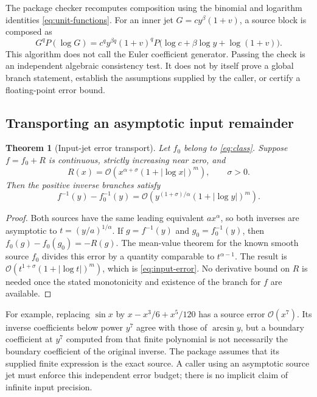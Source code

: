 \documentclass[11pt,a4paper]{article}
\numberwithin{equation}{section}
\newtheorem{theorem}{Theorem}[section]
\theoremstyle{definition}\newtheorem{definition}[theorem]{Definition}
\theoremstyle{remark}\newtheorem{remark}[theorem]{Remark}
\newcommand{\bigO}{\mathcal O}
\begin{document}
The package checker recomputes composition using the binomial and logarithm
identities \eqref{eq:unit-functions}. For an inner jet
\(G=c y^\beta(1+v)\), a source block is composed as
\begin{equation}\label{eq:checker-compose}
 G^q P(\log G)
 =c^q y^{\beta q}(1+v)^q
   P\bigl(\log c+\beta\log y+\log(1+v)\bigr).
\end{equation}
This algorithm does not call the Euler coefficient generator. Passing the
check is an independent algebraic consistency test. It does not by itself
prove a global branch statement, establish the assumptions supplied by the
caller, or certify a floating-point error bound.

\subsection{Transporting an asymptotic input remainder}
\begin{theorem}[Input-jet error transport]\label{thm:input-error}
Let \(f_0\) belong to \eqref{eq:class}. Suppose \(f=f_0+R\) is continuous,
strictly increasing near zero, and
\[
 R(x)=\bigO\!\left(x^{\alpha+\sigma}(1+|\log x|)^m\right),
 \qquad \sigma>0.
\]
Then the positive inverse branches satisfy
\begin{equation}\label{eq:input-error}
 f^{-1}(y)-f_0^{-1}(y)
 =\bigO\!\left(y^{(1+\sigma)/\alpha}(1+|\log y|)^m\right).
\end{equation}
\end{theorem}
\begin{proof}
Both sources have the same leading equivalent \(a x^\alpha\), so both
inverses are asymptotic to \(t=(y/a)^{1/\alpha}\). If \(g=f^{-1}(y)\) and
\(g_0=f_0^{-1}(y)\), then
\(f_0(g)-f_0(g_0)=-R(g)\). The mean-value theorem for the known smooth
source \(f_0\) divides this error by a quantity comparable to
\(t^{\alpha-1}\). The result is
\(\bigO(t^{1+\sigma}(1+|\log t|)^m)\), which is \eqref{eq:input-error}.
No derivative bound on \(R\) is needed once the stated monotonicity and
existence of the branch for \(f\) are available.
\end{proof}

For example, replacing \(\sin x\) by
\(x-x^3/6+x^5/120\) has a source error \(\bigO(x^7)\). Its inverse
coefficients below power \(y^7\) agree with those of \(\arcsin y\), but a
boundary coefficient at \(y^7\) computed from that finite polynomial is not
necessarily the boundary coefficient of the original inverse. The package
assumes that its supplied finite expression is the exact source. A caller
using an asymptotic source jet must enforce this independent error budget;
there is no implicit claim of infinite input precision.
\end{document}
